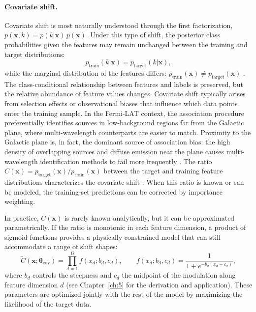 \paragraph{Covariate shift.}

Covariate shift is most naturally understood through the first factorization, $p(\mathbf{x}, k) = p(k|\mathbf{x})\,p(\mathbf{x})$.
Under this type of shift, the posterior class probabilities given the features may remain unchanged between the training and target distributions:
\begin{equation}
	p_{\text{train}}(k|\mathbf{x}) = p_{\text{target}}(k|\mathbf{x}),
	\label{eq:covariate_shift}
\end{equation}
while the marginal distribution of the features differs: $p_{\text{train}}(\mathbf{x}) \neq p_{\text{target}}(\mathbf{x})$ \cite{MorenoTorres2012AUV}.
The class-conditional relationship between features and labels is preserved, but the relative abundance of feature values changes.
Covariate shift typically arises from selection effects or observational biases that influence which data points enter the training sample.
In the Fermi-LAT context, the association procedure preferentially identifies sources in low-background regions far from the Galactic plane, where multi-wavelength counterparts are easier to match.
Proximity to the Galactic plane is, in fact, the dominant source of association bias: the high density of overlapping sources and diffuse emission near the plane causes multi-wavelength identification methods to fail more frequently \cite{2023RASTI...2..735M}.
The ratio $C(\mathbf{x}) = p_{\text{target}}(\mathbf{x})/p_{\text{train}}(\mathbf{x})$ between the target and training feature distributions characterizes the covariate shift \cite{MorenoTorres2012AUV}.
When this ratio is known or can be modeled, the training-set predictions can be corrected by importance weighting.

In practice, $C(\mathbf{x})$ is rarely known analytically, but it can be approximated parametrically.
If the ratio is monotonic in each feature dimension, a product of sigmoid functions provides a physically constrained model that can still accommodate a range of shift shapes:
\begin{equation}
	\tilde{C}(\mathbf{x};\boldsymbol{\theta}_{\text{cov}}) = \prod_{d=1}^{D} f(x_d; b_d, c_d), \qquad f(x_d; b_d, c_d) = \frac{1}{1 + e^{-b_d(x_d - c_d)}},
	\label{eq:sigmoid_modulation}
\end{equation}
where $b_d$ controls the steepness and $c_d$ the midpoint of the modulation along feature dimension $d$ (see Chapter~\ref{ch:5} for the derivation and application).
These parameters are optimized jointly with the rest of the model by maximizing the likelihood of the target data.

